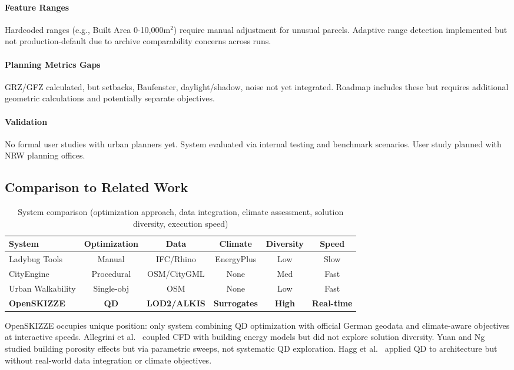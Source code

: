 \documentclass[times,final]{elsarticle}
\begin{document}
\paragraph{Feature Ranges}
Hardcoded ranges (e.g., Built Area 0-10,000m$^2$) require manual adjustment for unusual parcels. Adaptive range detection implemented but not production-default due to archive comparability concerns across runs.

\paragraph{Planning Metrics Gaps}
GRZ/GFZ calculated, but setbacks, Baufenster, daylight/shadow, noise not yet integrated. Roadmap includes these but requires additional geometric calculations and potentially separate objectives.

\paragraph{Validation}
No formal user studies with urban planners yet. System evaluated via internal testing and benchmark scenarios. User study planned with NRW planning offices.

\subsection{Comparison to Related Work}

\begin{table}[h]
\centering
\small
\begin{tabular}{lccccc}
\toprule
System & Optimization & Data & Climate & Diversity & Speed \\
\midrule
Ladybug Tools & Manual & IFC/Rhino & EnergyPlus & Low & Slow \\
CityEngine & Procedural & OSM/CityGML & None & Med & Fast \\
Urban Walkability & Single-obj & OSM & None & Low & Fast \\
\textbf{OpenSKIZZE} & \textbf{QD} & \textbf{LOD2/ALKIS} & \textbf{Surrogates} & \textbf{High} & \textbf{Real-time} \\
\bottomrule
\end{tabular}
\caption{System comparison (optimization approach, data integration, climate assessment, solution diversity, execution speed)}
\end{table}

OpenSKIZZE occupies unique position: only system combining QD optimization with official German geodata and climate-aware objectives at interactive speeds. Allegrini et al.~\cite{allegrini2015coupled} coupled CFD with building energy models but did not explore solution diversity. Yuan and Ng~\cite{yuan2012building} studied building porosity effects but via parametric sweeps, not systematic QD exploration. Hagg et al.~\cite{hagg2021evolving} applied QD to architecture but without real-world data integration or climate objectives.
\end{document}
